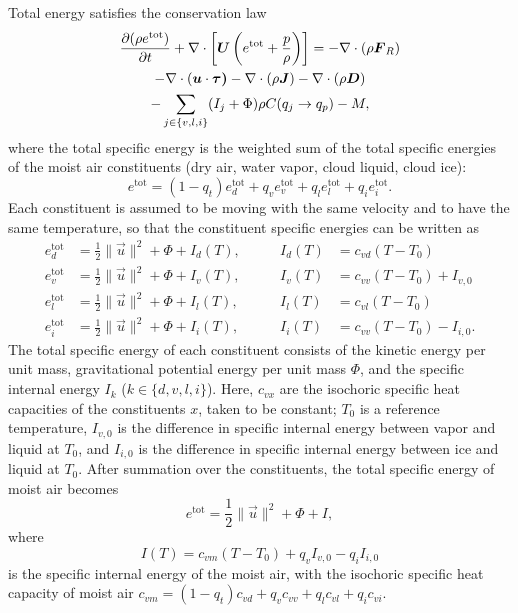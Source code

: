 \documentclass{article}
\begin{document}
Total energy satisfies the conservation law \citep{Romps08a}
\begin{multline}
 \frac{\partial (\rho e^{\mathrm{tot}})}{\partial t} + \nabla \cdot \left[\boldsymbol{{U}} \left(e^{\mathrm{tot}} + \frac{p}{\rho}\right) \right] 
 = -\nabla \cdot (\rho \boldsymbol{{F}}_R)   \\
  - \nabla \cdot (\boldsymbol{{u}} \cdot \boldsymbol{{\tau)}} - \nabla \cdot (\rho \boldsymbol{{J}}) - \nabla \cdot (\rho \boldsymbol{{D}})\\
   - \sum_{j\in\{v,l,i\}}(I_j + \Phi)  \rho C(q_j \rightarrow q_p) - M,
 \label{eq:energy_balance}
\end{multline}
where the total specific energy is the weighted sum of the total specific energies of the moist air constituents (dry air, water vapor, cloud liquid, cloud ice):
\begin{equation}
    e^{\mathrm{tot}} = (1-q_t) e_d^{\mathrm{tot}} + q_v e_v^{\mathrm{tot}} + q_l e_l^{\mathrm{tot}} + q_i e_i^{\mathrm{tot}}.
\end{equation}
Each constituent is assumed to be moving with the same velocity and to have the same temperature, so that the constituent specific energies can be written as
\begin{align}
e_d^{\mathrm{tot}} & = \frac{1}{2} \| \vec{u} \|^2 + \Phi + I_d(T), \qquad & I_d(T) & = c_{vd} (T - T_0)  \\
e_v^{\mathrm{tot}} & = \frac{1}{2} \| \vec{u} \|^2 + \Phi + I_v(T), \qquad & I_v(T) & = c_{vv} (T - T_0) + I_{v,0}\\
e_l^{\mathrm{tot}} & = \frac{1}{2} \| \vec{u} \|^2 + \Phi + I_l(T), \qquad & I_l(T) & = c_{vl} (T - T_0) \\
e_i^{\mathrm{tot}} & = \frac{1}{2} \| \vec{u} \|^2 + \Phi + I_i(T), \qquad & I_i(T) & = c_{vv} (T - T_0)  - I_{i,0}.
\end{align}
The total specific energy of each constituent consists of the kinetic energy per unit mass, gravitational potential energy per unit mass $\Phi$, and the specific internal energy $I_k$ ($k \in \{d, v, l, i\}$). Here, $c_{vx}$ are the isochoric specific heat capacities of the constituents $x$, taken to be constant;  $T_0$ is a reference temperature, $I_{v,0}$ is the difference in specific internal energy between vapor and liquid at $T_0$, and $I_{i,0}$ is the difference in specific internal energy between ice and liquid at $T_0$. After summation over the constituents, the total specific energy of moist air becomes
\begin{equation}
     e^{\mathrm{tot}} = \frac{1}{2} \| \vec{u} \|^2 + \Phi + I,
     \label{eq:total_energy_def}
\end{equation}
where 
\begin{equation}
     I(T) = c_{vm} (T - T_0)  + q_v I_{v,0} - q_i I_{i,0}
     \label{eq:total_internal_energy}
\end{equation}
is the specific internal energy of the moist air, with the isochoric specific heat capacity of moist air $c_{vm} = (1-q_t) c_{vd} + q_v c_{vv} + q_l c_{vl} + q_i c_{vi}$.
\end{document}
